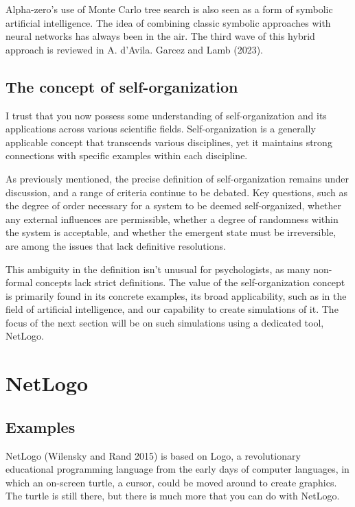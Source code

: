 \documentclass[
  a4paper,
  DIV=11,
  numbers=noendperiod,
  oneside]{scrreprt}
\begin{document}
Alpha-zero's use of Monte Carlo tree search is also seen as a form of
symbolic artificial intelligence. The idea of combining classic symbolic
approaches with neural networks has always been in the air. The third
wave of this hybrid approach is reviewed in A. d'Avila. Garcez and Lamb
(2023).

\hypertarget{sec-The-concept-of-selforganization}{%
\subsection{The concept of
self-organization}\label{sec-The-concept-of-selforganization}}

I trust that you now possess some understanding of self-organization and
its applications across various scientific fields. Self-organization is
a generally applicable concept that transcends various disciplines, yet
it maintains strong connections with specific examples within each
discipline.

As previously mentioned, the precise definition of self-organization
remains under discussion, and a range of criteria continue to be
debated. Key questions, such as the degree of order necessary for a
system to be deemed self-organized, whether any external influences are
permissible, whether a degree of randomness within the system is
acceptable, and whether the emergent state must be irreversible, are
among the issues that lack definitive resolutions.

This ambiguity in the definition isn't unusual for psychologists, as
many non-formal concepts lack strict definitions. The value of the
self-organization concept is primarily found in its concrete examples,
its broad applicability, such as in the field of artificial
intelligence, and our capability to create simulations of it. The focus
of the next section will be on such simulations using a dedicated tool,
NetLogo.

\hypertarget{sec-NetLogo}{%
\section{NetLogo}\label{sec-NetLogo}}

\hypertarget{sec-Examples}{%
\subsection{Examples}\label{sec-Examples}}

NetLogo (Wilensky and Rand 2015) is based on Logo, a revolutionary
educational programming language from the early days of computer
languages, in which an on-screen turtle, a cursor, could be moved around
to create graphics. The turtle is still there, but there is much more
that you can do with NetLogo.
\end{document}
